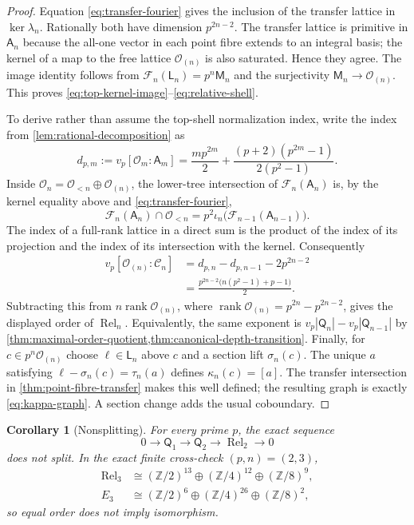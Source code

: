 \documentclass[12pt,a4paper]{article}
\newtheorem{corollary}[theorem]{Corollary}
\theoremstyle{definition}
\newcommand{\Z}{\mathbb Z}
\newcommand{\A}{\mathsf A}
\newcommand{\OO}{\mathcal O}
\newcommand{\LL}{\mathsf L}
\newcommand{\QQ}{\mathsf Q}
\newcommand{\Rel}{\operatorname{Rel}}
\newcommand{\rank}{\operatorname{rank}}
\newcommand{\vp}{v_p}
\begin{document}
\begin{proof}
Equation \eqref{eq:transfer-fourier} gives the inclusion of the transfer
lattice in $\ker\lambda_n$.  Rationally both have dimension $p^{2n-2}$.
The transfer lattice is primitive in $\A_n$ because the all-one vector in
each point fibre extends to an integral basis; the kernel of a map to the
free lattice $\OO_{(n)}$ is also saturated.  Hence they agree.  The image
identity follows from
$\mathcal F_n(\LL_n)=p^n\mathsf M_n$ and the surjectivity
$\mathsf M_n\to\OO_{(n)}$.  This proves
\eqref{eq:top-kernel-image}--\eqref{eq:relative-shell}.

To derive rather than assume the top-shell normalization index, write the
index from \cref{lem:rational-decomposition} as
\[
 d_{p,m}:=\vp[\OO_m:\A_m]
 =\frac{mp^{2m}}2+
   \frac{(p+2)(p^{2m}-1)}{2(p^2-1)}.
\]
Inside $\OO_n=\OO_{<n}\oplus\OO_{(n)}$, the lower-tree intersection of
$\mathcal F_n(\A_n)$ is, by the kernel equality above and
\eqref{eq:transfer-fourier},
\[
 \mathcal F_n(\A_n)\cap\OO_{<n}
 =p^2\iota_n\bigl(\mathcal F_{n-1}(\A_{n-1})\bigr).
\]
The index of a full-rank lattice in a direct sum is the product of the index
of its projection and the index of its intersection with the kernel.
Consequently
\begin{align*}
 \vp[\OO_{(n)}:\mathcal C_n]
 &=d_{p,n}-d_{p,n-1}-2p^{2n-2}\\
 &=\frac{p^{2n-2}\bigl(n(p^2-1)+p-1\bigr)}2.
\end{align*}
Subtracting this from $n\rank\OO_{(n)}$, where
$\rank\OO_{(n)}=p^{2n}-p^{2n-2}$, gives the displayed order of $\Rel_n$.
Equivalently, the same exponent is
$\vp|\QQ_n|-\vp|\QQ_{n-1}|$ by
\cref{thm:maximal-order-quotient,thm:canonical-depth-transition}.
Finally, for $c\in p^n\OO_{(n)}$ choose $\ell\in\LL_n$ above $c$ and a
section lift $\sigma_n(c)$.  The unique $a$ satisfying
$\ell-\sigma_n(c)=\tau_n(a)$ defines $\kappa_n(c)=[a]$.  The transfer
intersection in \cref{thm:point-fibre-transfer} makes this well defined; the resulting
graph is exactly \eqref{eq:kappa-graph}.  A section change adds the usual
coboundary.
\end{proof}

\begin{corollary}[Nonsplitting]
\label{cor:nonsplitting}
For every prime $p$, the exact sequence
\[
 0\longrightarrow\QQ_1\longrightarrow\QQ_2
 \longrightarrow\Rel_2\longrightarrow0
\]
does not split.  In the exact finite cross-check $(p,n)=(2,3)$,
\begin{align*}
 \Rel_3&\cong(\Z/2)^{13}\oplus(\Z/4)^{12}\oplus(\Z/8)^9,\\
 E_3&\cong(\Z/2)^6\oplus(\Z/4)^{26}\oplus(\Z/8)^2,
\end{align*}
so equal order does not imply isomorphism.
\end{corollary}
\end{document}

